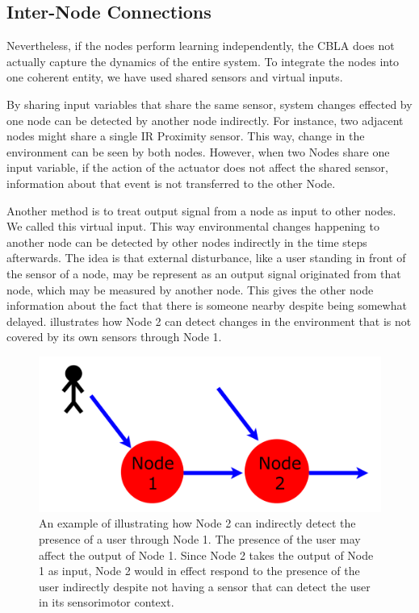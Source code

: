 \subsection{Inter-Node Connections}

Nevertheless, if the nodes perform learning independently, the CBLA does not actually capture the dynamics of the entire system. To integrate the nodes into one coherent entity, we have used shared sensors and virtual inputs.

By sharing input variables that share the same sensor, system changes effected by one node can be detected by another node indirectly. For instance, two adjacent nodes might share a single IR Proximity sensor. This way, change in the environment can be seen by both nodes. However, when two Nodes share one input variable, if the action of the actuator does not affect the shared sensor, information about that event is not transferred to the other Node. 

Another method is to treat output signal from a node as input to other nodes. We called this virtual input. This way environmental changes happening to another node can be detected by other nodes indirectly in the time steps afterwards. The idea is that external disturbance, like a user standing in front of the sensor of a node, may be represent as an output signal originated from that node, which may be measured by another node. This gives the other node information about the fact that there is someone nearby despite being somewhat delayed.  illustrates how Node 2 can detect changes in the environment that is not covered by its own sensors through Node 1.


\begin{figure}[!htbp]
	\centering
	\includegraphics[height=0.20 \textheight]{"fig/cbla/Indirect input diagram"}
	\caption[Illustration explaining how virtual inputs may be used to detect changes outside of a node's sensorimotor context]{An example of illustrating how Node 2 can indirectly detect the presence of a user through Node 1. The presence of the user may affect the output of Node 1. Since Node 2 takes the output of Node 1 as input, Node 2 would in effect respond to the presence of the user indirectly despite not having a sensor that can detect the user in its sensorimotor context.}
	\label{fig:Indirect input diagram}
\end{figure}

\FloatBarrier  

